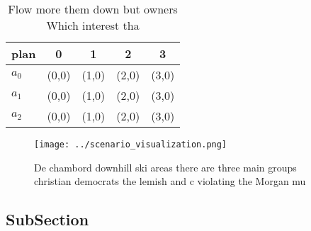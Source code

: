 \documentclass[a4paper]{article}
\begin{document}
\begin{table}
\begin{adjustbox}{width=0.5\columnwidth}
\begin{tabular}{|l|l|l|l|l|}
\hline
\textbf{plan} & \multicolumn{1}{c|}{\textbf{0}} & \multicolumn{1}{c|}{\textbf{1}} & \multicolumn{1}{c|}{\textbf{2}} & \multicolumn{1}{c|}{\textbf{3}} \\ \hline
\textbf{$a_0$}  & (0,0) & (1,0) & (2,0) & (3,0) \\ \hline
\textbf{$a_1$}  & (0,0) & (1,0) & (2,0) & (3,0) \\ \hline
\textbf{$a_2$}  & (0,0) & (1,0) & (2,0) & (3,0) \\ \hline
\end{tabular}
\end{adjustbox}
\caption{Flow more them down but owners Which interest tha
}
\end{table}

\begin{figure}
\centering
\texttt{[image: ../scenario\_visualization.png]}
\caption{De chambord downhill ski areas there are three main groups christian democrats the lemish and c violating the Morgan mu
}
\end{figure}
 
\subsection{SubSection}
\end{document}
